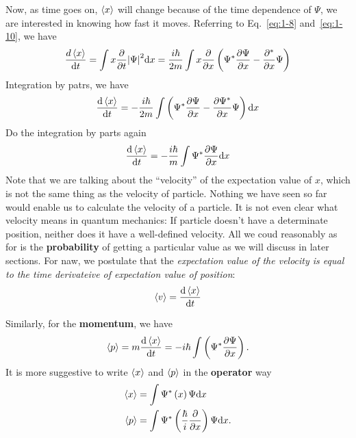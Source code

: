Now, as time goes on, $\expval{x}$ will change because of the time dependence of $\Psi$, we are interested in knowing how fast it moves.
Referring to Eq.~\eqref{eq:1-8} and~\eqref{eq:1-10}, we have
\begin{equation}
  \label{eq:1-11}
 \frac{d\expval{x}}{\dd t} = \int x \frac{\partial}{\partial t} \abs{\Psi}^{2} \dd x = \frac{i\hbar}{2m} \int x \frac{\partial}{\partial x} \left( \Psi^{*} \frac{\partial \Psi}{\partial x} - \frac{\partial^{*}}{\partial x} \Psi \right)
\end{equation}
Integration by patrs, we have
\begin{equation}
  \label{eq:1-12}
  \frac{\dd \expval{x}}{\dd t} = - \frac{i\hbar}{2m} \int \left( \Psi^{*} \frac{\partial \Psi}{\partial x} - \frac{\partial \Psi^{*}}{\partial x} \Psi \right) \dd x
\end{equation}
Do the integration by parts again
\begin{equation}
  \label{eq:1-13}
  \frac{\dd \expval{x}}{\dd t} = - \frac{i \hbar}{m} \int \Psi^{*} \frac{\partial \Psi}{\partial x} \dd x
\end{equation}
Note that we are talking about the ``velocity'' of the expectation value of $x$, which is not the same thing as the velocity of particle.
Nothing we have seen so far would enable us to calculate the velocity of a particle.
It is not even clear what velocity means in quantum mechanics: If particle doesn't have a determinate position, neither does it have a well-defined velocity.
All we coud reasonably as for is the \textbf{probability} of getting a particular value as we will discuss in later sections.
For naw, we postulate that the \textit{expectation value of the velocity is equal to the time derivateive of expectation value of position}:
\begin{equation}
  \label{eq:1-14}
  \expval{v} = \frac{\dd \expval{x}}{\dd t}
\end{equation}

Similarly, for the \textbf{momentum}, we have
\begin{equation}
  \label{eq:1-15}
  \expval{p} = m \frac{\dd \expval{x}}{\dd t} = - i \hbar \int \left( \Psi^{*} \frac{\partial \Psi}{\partial x} \right).
\end{equation}
It is more suggestive to write $\expval{x}$ and $\expval{p}$ in the \textbf{operator} way
\begin{align}
  \label{eq:1-16}
  \expval{x} &= \int \Psi^{*} \left( x \right) \Psi \dd x \\
  \label{eq:1-17}
  \expval{p} &= \int \Psi^{*} \left( \frac{\hbar}{i} \frac{\partial}{\partial x} \right) \Psi \dd x.
\end{align}

